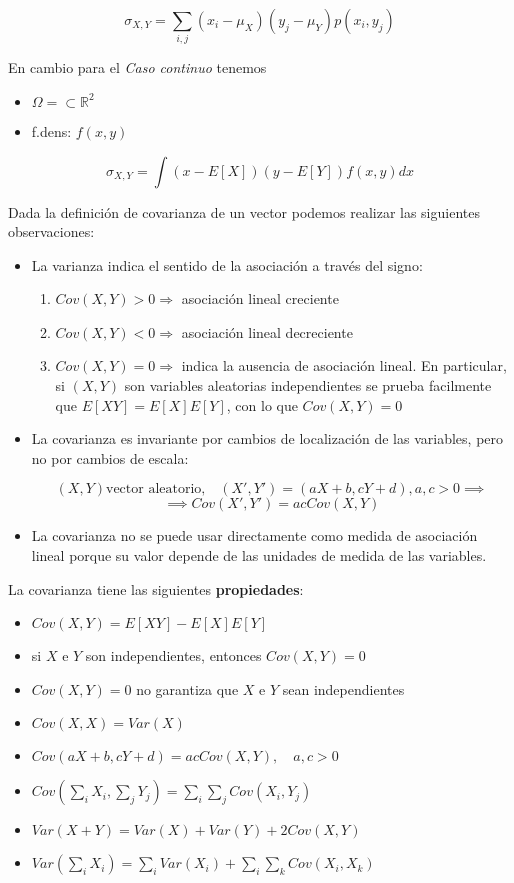 \[ \sigma_{X, Y} = \displaystyle\sum_{i,j}(x_i - \mu_{X})(y_j - \mu_{Y})p(x_i, y_j) \]

En cambio para el \textit{Caso continuo} tenemos
\begin{itemize}
    \item $\Omega = \subset \mathbb{R}^2$
    \item f.dens: $f(x, y)$
\end{itemize}

\[ \sigma_{X, Y} = \int (x - E[X])(y - E[Y])f(x, y)dx \]

Dada la definición de covarianza de un vector podemos realizar las siguientes observaciones:

\begin{itemize}
    \item La varianza indica el sentido de la asociación a través del signo:
    \begin{enumerate}
        \item $Cov(X, Y) > 0 \Rightarrow$ asociación lineal creciente
        \item $Cov(X, Y) < 0 \Rightarrow$ asociación lineal decreciente
        \item $Cov(X, Y) = 0 \Rightarrow$ indica la ausencia de asociación lineal. En particular, si $(X, Y)$ son variables aleatorias independientes
                se prueba facilmente que $E[XY] = E[X]E[Y]$, con lo que $Cov(X, Y) = 0$
    \end{enumerate}
    \item La covarianza es invariante por cambios de localización de las variables, pero no por cambios de escala:
     
    \[ (X, Y) \text{vector aleatorio,} \quad (X', Y') = (aX + b, cY + d), a, c > 0 \implies \]
    \[ \implies Cov(X', Y') = acCov(X, Y) \]

    \item La covarianza no se puede usar directamente como medida de asociación lineal porque su valor depende de las unidades de medida de las variables.
\end{itemize}

La covarianza tiene las siguientes \textbf{propiedades}:
\begin{itemize}
    \item $Cov(X, Y) = E[XY] - E[X]E[Y]$
    \item si $X$ e $Y$ son independientes, entonces $Cov(X, Y) = 0$
    \item $Cov(X, Y) = 0$ no garantiza que $X$ e $Y$ sean independientes
    \item $Cov(X, X) = Var(X)$
    \item $Cov(aX + b, cY + d) = acCov(X, Y),\quad a, c >0$
    \item $Cov(\sum_{i}X_i, \sum_{j}Y_j) = \sum_{i}\sum_{j}Cov(X_i, Y_j)$
    \item $Var(X + Y) = Var(X) + Var(Y) + 2Cov(X, Y)$
    \item $Var(\sum_{i}X_i) = \sum_{i}Var(X_i) + \sum_i\sum_kCov(X_i, X_k)$
\end{itemize}

